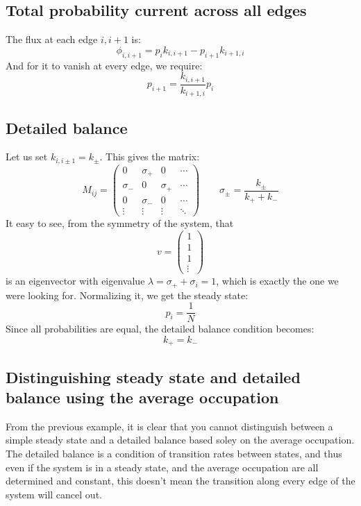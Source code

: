 \documentclass{article}
\begin{document}
\subsection{Total probability current across all edges}
The flux at each edge $i,i+1$ is:
\begin{equation}
    \boxed{\phi_{i, i + 1} = p_i k_{i, i + 1} - p_{i + 1} k_{i + 1, i}}
\end{equation}
And for it to vanish at every edge, we require:
\begin{equation}
    \boxed{p_{i + 1} = \frac{k_{i, i + 1}}{k_{i + 1, i}} p_i}
\end{equation}
\subsection{Detailed balance}
Let us set $k_{i, i \pm 1} = k_{\pm}$. This gives the matrix:
\begin{equation}
    M_{ij} = \begin{pmatrix}
        0 & \sigma_{+} & 0 & \cdots \\
        \sigma_{-} & 0 & \sigma_{+} & \cdots \\
        0 & \sigma_{-} & 0 & \cdots \\
        \vdots & \vdots & \vdots & \ddots
    \end{pmatrix}
    \qquad
    \sigma_{\pm} = \frac{k_{\pm}}{k_{+} + k_{-}}
\end{equation}
It easy to see, from the symmetry of the system, that
\begin{equation}
    v = \begin{pmatrix}
        1 \\ 1 \\ 1 \\ \vdots
    \end{pmatrix}
\end{equation}
is an eigenvector with eigenvalue $\lambda = \sigma_{+} + \sigma_{i} = 1$, which is exactly the one we were looking for. Normalizing it, we get the steady state:
\begin{equation}
    \boxed{p_i = \frac{1}{N}}
\end{equation}
Since all probabilities are equal, the detailed balance condition becomes:
\begin{equation}
    \boxed{k_{+} = k_{-}}
\end{equation}
\subsection{Distinguishing steady state and detailed balance using the average occupation}
From the previous example, it is clear that you cannot distinguish between a simple steady state and a detailed balance based soley on the average occupation. The detailed balance is a condition of transition rates between states, and thus even if the system is in a steady state, and the average occupation are all determined and constant, this doesn't mean the transition along every edge of the system will cancel out.
\end{document}

